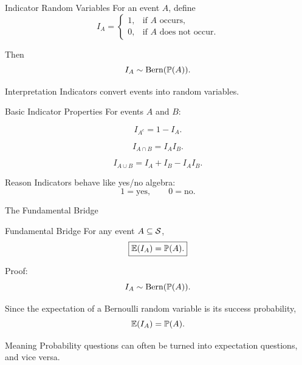
\begin{frame}{Indicator Random Variables}
For an event $A$, define
\[
I_A=
\begin{cases}
1,&\text{if }A\text{ occurs},\\
0,&\text{if }A\text{ does not occur}.
\end{cases}
\]

\vspace{0.25cm}

Then
\[
I_A\sim \operatorname{Bern}(\mathbb{P}(A)).
\]

\vspace{0.25cm}

\begin{keybox}{Interpretation}
Indicators convert events into random variables.
\end{keybox}
\end{frame}

\begin{frame}{Basic Indicator Properties}
For events $A$ and $B$:

\[
I_{A^c}=1-I_A.
\]

\[
I_{A\cap B}=I_AI_B.
\]

\[
I_{A\cup B}=I_A+I_B-I_AI_B.
\]

\vspace{0.25cm}

\begin{keybox}{Reason}
Indicators behave like yes/no algebra:
\[
1=\text{yes},
\qquad
0=\text{no}.
\]
\end{keybox}
\end{frame}

\begin{frame}{The Fundamental Bridge}
\begin{keybox}{Fundamental Bridge}
For any event $A\subseteq \mathcal{S}$,
\[
\boxed{
\mathbb{E}(I_A)=\mathbb{P}(A).
}
\]
\end{keybox}

\vspace{0.25cm}

Proof:
\[
I_A\sim \operatorname{Bern}(\mathbb{P}(A)).
\]

Since the expectation of a Bernoulli random variable is its success probability,
\[
\mathbb{E}(I_A)=\mathbb{P}(A).
\]

\vspace{0.25cm}

\begin{keybox}{Meaning}
Probability questions can often be turned into expectation questions, and vice versa.
\end{keybox}
\end{frame}



